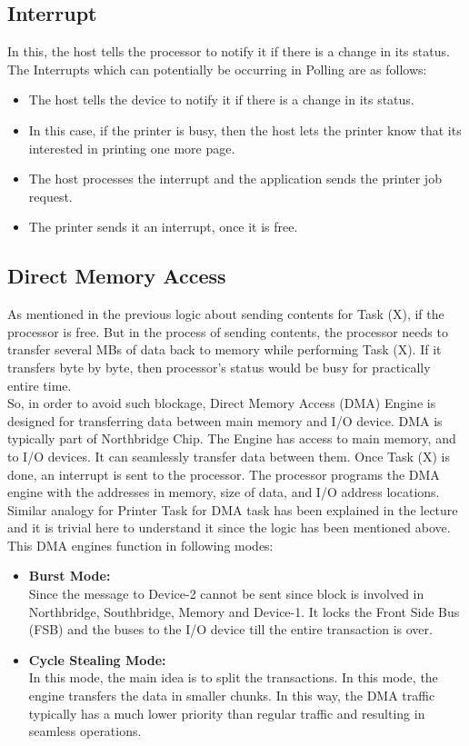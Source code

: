 \documentclass[12pt]{article}
\begin{document}
\subsection{Interrupt}
In this, the host tells the processor to notify it if there is a change in its status. The Interrupts which can potentially be occurring in Polling are as follows:
\begin{itemize}
    \item The host tells the device to notify it if there is a change in its status.
    \item In this case, if the printer is busy, then the host lets the printer know that its interested in printing one more page.
    \item The host processes the interrupt and the application sends the printer job request.
    \item The printer sends it an interrupt, once it is free.
\end{itemize}
   

\subsection{Direct Memory Access}
As mentioned in the previous logic about sending contents for Task (X), if the processor is free. But in the process of sending contents, the processor needs to transfer several MBs of data back to memory while performing Task (X). If it transfers byte by byte, then processor's status would be busy for practically entire time. \\

So, in order to avoid such blockage, Direct Memory Access (DMA) Engine is designed for transferring data between main memory and I/O device. DMA is typically part of Northbridge Chip. The Engine has access to main memory, and to I/O devices. It can seamlessly transfer data between them. Once Task (X) is done, an interrupt is sent to the processor. The processor programs the DMA engine with the addresses in memory, size of data, and I/O address locations. \\

Similar analogy for Printer Task for DMA task has been explained in the lecture and it is trivial here to understand it since the logic has been mentioned above. This DMA engines function in following modes:

\begin{itemize}
    \item \textbf{Burst Mode:} \\
    Since the message to Device-2 cannot be sent since block is involved in Northbridge, Southbridge, Memory and Device-1. It locks the Front Side Bus (FSB) and the buses to the I/O device till the entire transaction is over. 
    \item \textbf{Cycle Stealing Mode:} \\
    In this mode, the main idea is to split the transactions. In this mode, the engine transfers the data in smaller chunks. In this way, the DMA traffic typically has a much lower priority than regular traffic and resulting in seamless operations.
 
\end{itemize}

\end{document}
